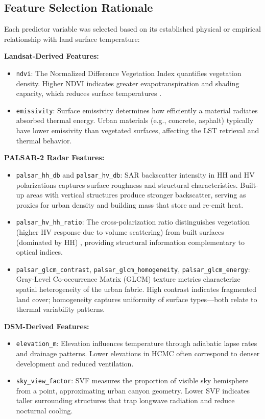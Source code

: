 \documentclass[
]{article}
\begin{document}
\subsection{Feature Selection Rationale}
\label{subsec:features}

Each predictor variable was selected based on its established physical or empirical relationship with land surface temperature:

\textbf{Landsat-Derived Features:}

\begin{itemize}
\item \texttt{ndvi}: The Normalized Difference Vegetation Index quantifies vegetation density. Higher NDVI indicates greater evapotranspiration and shading capacity, which reduces surface temperatures \citep{usgs2024}.
\item \texttt{emissivity}: Surface emissivity determines how efficiently a material radiates absorbed thermal energy. Urban materials (e.g., concrete, asphalt) typically have lower emissivity than vegetated surfaces, affecting the LST retrieval and thermal behavior.
\end{itemize}

\textbf{PALSAR-2 Radar Features:}

\begin{itemize}
\item \texttt{palsar\_hh\_db} and \texttt{palsar\_hv\_db}: SAR backscatter intensity in HH and HV polarizations captures surface roughness and structural characteristics. Built-up areas with vertical structures produce stronger backscatter, serving as proxies for urban density and building mass that store and re-emit heat.
\item \texttt{palsar\_hv\_hh\_ratio}: The cross-polarization ratio distinguishes vegetation (higher HV response due to volume scattering) from built surfaces (dominated by HH) \citep{shimada2014}, providing structural information complementary to optical indices.
\item \texttt{palsar\_glcm\_contrast}, \texttt{palsar\_glcm\_homogeneity}, \texttt{palsar\_glcm\_energy}: Gray-Level Co-occurrence Matrix (GLCM) texture metrics characterize spatial heterogeneity of the urban fabric. High contrast indicates fragmented land cover; homogeneity captures uniformity of surface types---both relate to thermal variability patterns.
\end{itemize}

\textbf{DSM-Derived Features:}

\begin{itemize}
\item \texttt{elevation\_m}: Elevation influences temperature through adiabatic lapse rates and drainage patterns. Lower elevations in HCMC often correspond to denser development and reduced ventilation.
\item \texttt{sky\_view\_factor}: SVF measures the proportion of visible sky hemisphere from a point, approximating urban canyon geometry. Lower SVF indicates taller surrounding structures that trap longwave radiation and reduce nocturnal cooling.
\end{itemize}
\end{document}
